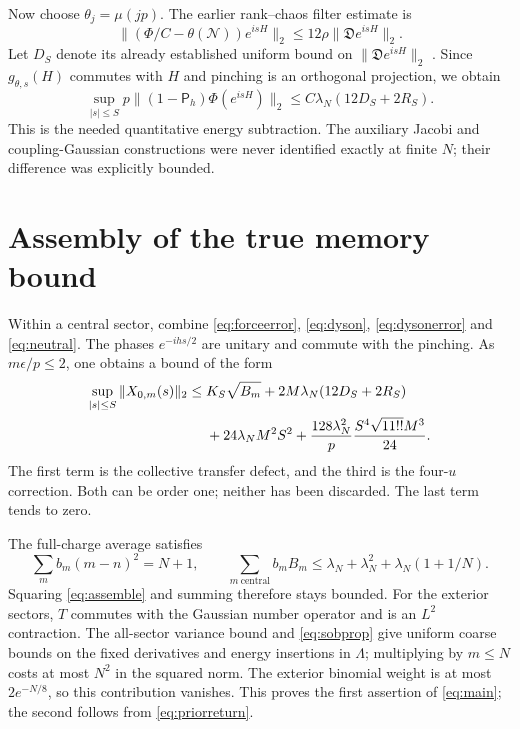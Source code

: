 \documentclass[11pt,a4paper]{article}
\newcommand{\NN}{\mathcal N}
\newcommand{\DD}{\mathfrak D}
\newcommand{\PP}{\mathsf P_h}
\begin{document}
Now choose $\theta_j=\mu(jp)$. The earlier rank--chaos filter estimate is
\begin{equation}
 \|(\Phi/C-\theta(\NN))e^{isH}\|_2
 \le12\rho\|\DD e^{isH}\|_2.
\end{equation}
Let $D_S$ denote its already established uniform bound on
$\|\DD e^{isH}\|_2$ \cite{Rank}. Since $g_{\theta,s}(H)$ commutes
with $H$ and pinching is an orthogonal projection, we obtain
\begin{equation}
 \boxed{\quad
 \sup_{|s|\le S}p\|(1-\PP)\Phi(e^{isH})\|_2
 \le C\lambda_N(12D_S+2R_S).\quad}
 \label{eq:neutral}
\end{equation}
This is the needed quantitative energy subtraction. The auxiliary
Jacobi and coupling-Gaussian constructions were never identified
exactly at finite $N$; their difference was explicitly bounded.

\newpage
\section{Assembly of the true memory bound}
Within a central sector, combine \eqref{eq:forceerror},
\eqref{eq:dyson}, \eqref{eq:dysonerror} and \eqref{eq:neutral}.
The phases $e^{-ihs/2}$ are unitary and commute with the pinching.
As $m\epsilon/p\le2$, one obtains a bound of the form
\begin{align}
 \sup_{|s|\le S}\|X_{0,m}(s)\|_2
 \le{}&K_S\sqrt{B_m}
       +2M\lambda_N(12D_S+2R_S)\notag\\
      &+24\lambda_NM^2S^2
       +\frac{128\lambda_N^2}{p}\frac{S^4\sqrt{11!!}M^3}{24}.
 \label{eq:assemble}
\end{align}
The first term is the collective transfer defect, and the third
is the four-$u$ correction. Both can be order one; neither has been
discarded. The last term tends to zero.

The full-charge average satisfies
\begin{equation}
 \sum_m b_m(m-n)^2=N+1,\qquad
 \sum_{m\ \text{central}}b_m B_m
 \le\lambda_N+\lambda_N^2+\lambda_N(1+1/N).
\end{equation}
Squaring \eqref{eq:assemble} and summing therefore stays bounded.
For the exterior sectors, $T$ commutes with the Gaussian number
operator and is an $L^2$ contraction. The all-sector variance bound
and \eqref{eq:sobprop} give uniform coarse bounds on the fixed
derivatives and energy insertions in $\Lambda$; multiplying by
$m\le N$ costs at most $N^2$ in the squared norm. The exterior
binomial weight is at most $2e^{-N/8}$, so this contribution vanishes.
This proves the first assertion of \eqref{eq:main}; the second follows
from \eqref{eq:priorreturn}.
\end{document}
